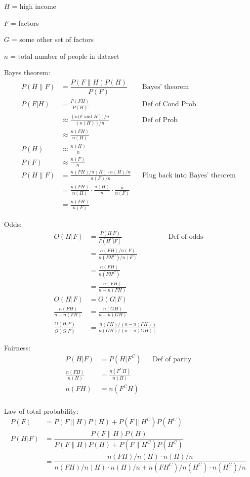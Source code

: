 \documentclass[12pt]{article}
\begin{document}
$H$ = high income

$F$ = factors

$G$ = some other set of factors

$n$ = total number of people in dataset

Bayes theorem:
\begin{align*}
    P(H\|F) &= \dfrac{P(F \| H) P(H)}{P(F)} && \text{Bayes' theorem} \\
    P(F|H) &= \frac{P(FH)}{P(H)} && \text{Def of Cond Prob} \\
    &\approx \frac{
    	(\text{$n(F$ and $H$})) / n
    }{
    	(\text{$n(H)$}) / n
    } && \text{Def of Prob} \\
    &\approx \frac{n(FH)}{n(H)} \\
    P(H) &\approx \frac{n(H)}{n} \\
    P(F) &\approx \frac{n(F)}{n} \\
    P(H\|F) &= \frac{n(FH)/n(H) \cdot n(H)/n}{n(F)/n} && \text{Plug back into Bayes' theorem} \\
    &= \frac{n(FH)}{n(H)} \cdot \frac{n(H)}{n} \cdot \frac{n}{n(F)}  \\
    &= \frac{n(FH)}{n(F)}
\end{align*}

Odds:
\begin{align*}
    O(H | F) &= \frac{P(H | F)}{P(H^C | F)} && \text{Def of odds} \\
    &= \frac{n(FH)/n(F)}{n(FH^C)/n(F)} \\
    &= \frac{n(FH)}{n(FH^C)} \\
    &= \frac{n(FH)}{n - n(FH)} \\
    O(H | F) &= O(G | F) \\
    \frac{n(FH)}{n - n(FH)} &= \frac{n(GH)}{n - n(GH)} \\
    \frac{O(H | F)}{O(G | F)} &= \frac{n(FH)/(n - n(FH))}{n(GH)/(n - n(GH))}
\end{align*}

Fairness:
\begin{align*}
    P(H | F) &= P(H | F^C) && \text{Def of parity}\\
    \frac{n(FH)}{n(H)} &= \frac{n(F^CH)}{n(H)} \\
    n(FH) &= n(F^CH) \\
\end{align*}

Law of total probability:
\begin{align*}
    P(F) &= P(F \| H) P(H) + P(F \| H^C) P(H^C) \\
    P(H | F) &= \dfrac{P(F \| H) P(H)}{P(F \| H) P(H) + P(F \| H^C) P(H^C)} \\
    &= \dfrac{n(FH)/n(H) \cdot n(H)/n}{n(FH)/n(H) \cdot n(H)/n + n(FH^C)/n(H^C) \cdot n(H^C)/n}
\end{align*}
\end{document}
